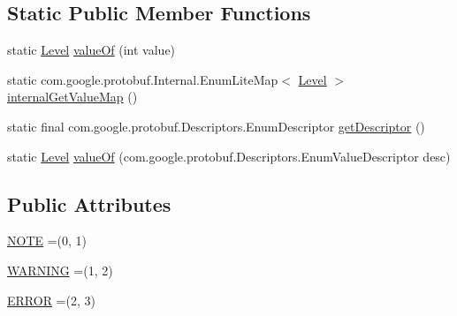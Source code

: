 \subsection*{Static Public Member Functions}
\begin{DoxyCompactItemize}
\item 
static \mbox{\hyperlink{enumcom_1_1mysql_1_1cj_1_1x_1_1protobuf_1_1_mysqlx_notice_1_1_warning_1_1_level}{Level}} \mbox{\hyperlink{enumcom_1_1mysql_1_1cj_1_1x_1_1protobuf_1_1_mysqlx_notice_1_1_warning_1_1_level_a0490897768e5bbc1407d9f46cb77d011}{value\+Of}} (int value)
\item 
static com.\+google.\+protobuf.\+Internal.\+Enum\+Lite\+Map$<$ \mbox{\hyperlink{enumcom_1_1mysql_1_1cj_1_1x_1_1protobuf_1_1_mysqlx_notice_1_1_warning_1_1_level}{Level}} $>$ \mbox{\hyperlink{enumcom_1_1mysql_1_1cj_1_1x_1_1protobuf_1_1_mysqlx_notice_1_1_warning_1_1_level_a5112b45ae6899cc4bcb307f127b3e784}{internal\+Get\+Value\+Map}} ()
\item 
static final com.\+google.\+protobuf.\+Descriptors.\+Enum\+Descriptor \mbox{\hyperlink{enumcom_1_1mysql_1_1cj_1_1x_1_1protobuf_1_1_mysqlx_notice_1_1_warning_1_1_level_aec392f8349f8ef7b775b76921c54af4a}{get\+Descriptor}} ()
\item 
static \mbox{\hyperlink{enumcom_1_1mysql_1_1cj_1_1x_1_1protobuf_1_1_mysqlx_notice_1_1_warning_1_1_level}{Level}} \mbox{\hyperlink{enumcom_1_1mysql_1_1cj_1_1x_1_1protobuf_1_1_mysqlx_notice_1_1_warning_1_1_level_a10cc5f6905869382f00bf8d5cafc2f46}{value\+Of}} (com.\+google.\+protobuf.\+Descriptors.\+Enum\+Value\+Descriptor desc)
\end{DoxyCompactItemize}
\subsection*{Public Attributes}
\begin{DoxyCompactItemize}
\item 
\mbox{\hyperlink{enumcom_1_1mysql_1_1cj_1_1x_1_1protobuf_1_1_mysqlx_notice_1_1_warning_1_1_level_ac2667c96d72322268a45472daccdf93c}{N\+O\+TE}} =(0, 1)
\item 
\mbox{\hyperlink{enumcom_1_1mysql_1_1cj_1_1x_1_1protobuf_1_1_mysqlx_notice_1_1_warning_1_1_level_a340b65b4419690da8e8e593c54f7e46f}{W\+A\+R\+N\+I\+NG}} =(1, 2)
\item 
\mbox{\hyperlink{enumcom_1_1mysql_1_1cj_1_1x_1_1protobuf_1_1_mysqlx_notice_1_1_warning_1_1_level_ad98493bcee681b36788be787714329f9}{E\+R\+R\+OR}} =(2, 3)
\end{DoxyCompactItemize}
